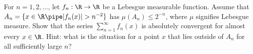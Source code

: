 For $n=1,2,\ldots $, let $f_n:\R\rightarrow \R$ be a Lebesgue
measurable function. Assume that $A_n=\{x\in \R\pipe|f_n(x)|>n^{-2}\}$
has $\mu(A_n)\leq 2^{-n}$, where $\mu$ signifies Lebesgue measure.
Show that the series $\sum_{n=1}^{\infty}f_n(x)$ is absolutely
convergent for almost every $x\in \R$. Hint: what is the situation for
a point $x$ that lies outside of $A_n$ for all sufficiently large $n$?
